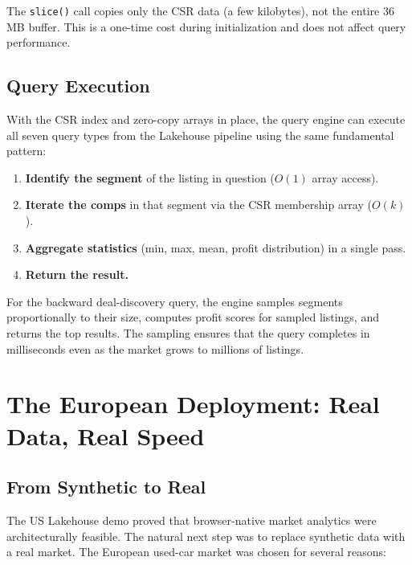 \documentclass[11pt,a4paper,twoside]{book}
\begin{document}
The \texttt{slice()} call copies only the CSR data (a few kilobytes), not the entire 36\,MB
buffer. This is a one-time cost during initialization and does not affect query performance.

\section{Query Execution}

With the CSR index and zero-copy arrays in place, the query engine can execute all seven
query types from the Lakehouse pipeline using the same fundamental pattern:

\begin{enumerate}[leftmargin=*]
    \item \textbf{Identify the segment} of the listing in question ($O(1)$ array access).
    \item \textbf{Iterate the comps} in that segment via the CSR membership array ($O(k)$).
    \item \textbf{Aggregate statistics} (min, max, mean, profit distribution) in a single pass.
    \item \textbf{Return the result.}
\end{enumerate}

For the backward deal-discovery query, the engine samples segments proportionally to their
size, computes profit scores for sampled listings, and returns the top results. The sampling
ensures that the query completes in milliseconds even as the market grows to millions of
listings.

\chapter{The European Deployment: Real Data, Real Speed}

\section{From Synthetic to Real}

The US Lakehouse demo proved that browser-native market analytics were architecturally
feasible. The natural next step was to replace synthetic data with a real market. The
European used-car market was chosen for several reasons:
\end{document}
